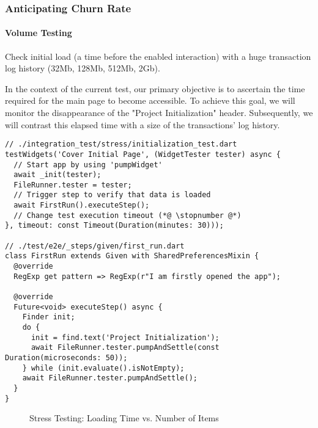 \subsubsection{Anticipating Churn Rate}
\paragraph{Volume Testing}
Check initial load (a time before the enabled interaction) with a huge transaction log history (32Mb, 128Mb, 
512Mb, 2Gb).

In the context of the current test, our primary objective is to ascertain the time required for the main page to 
become accessible. To achieve this goal, we will monitor the disappearance of the "Project Initialization" header. 
Subsequently, we will contrast this elapsed time with a size of the transactions' log history.

\begin{lstlisting}
// ./integration_test/stress/initialization_test.dart
testWidgets('Cover Initial Page', (WidgetTester tester) async {
  // Start app by using 'pumpWidget'
  await _init(tester);
  FileRunner.tester = tester;
  // Trigger step to verify that data is loaded
  await FirstRun().executeStep();
  // Change test execution timeout (*@ \stopnumber @*)
}, timeout: const Timeout(Duration(minutes: 30)));

// ./test/e2e/_steps/given/first_run.dart
class FirstRun extends Given with SharedPreferencesMixin {
  @override
  RegExp get pattern => RegExp(r"I am firstly opened the app");

  @override
  Future<void> executeStep() async {
    Finder init;
    do {
      init = find.text('Project Initialization');
      await FileRunner.tester.pumpAndSettle(const Duration(microseconds: 50));
    } while (init.evaluate().isNotEmpty);
    await FileRunner.tester.pumpAndSettle();
  }
}
\end{lstlisting}

\begin{figure}
\caption{Stress Testing: Loading Time vs. Number of Items} \label{t-stress}
\end{figure}

